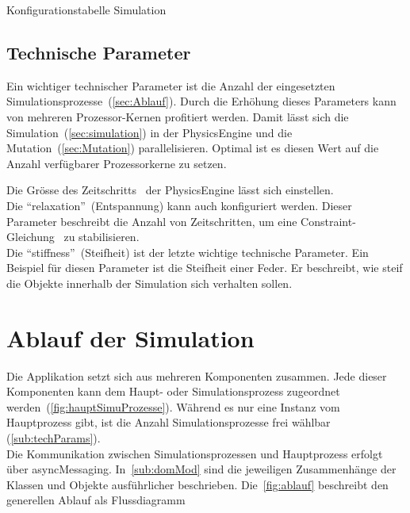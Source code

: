     \begin{table}[H]
      
      \caption{Konfigurationstabelle Simulation\label{tbl:simulation-parameters-general}}
    \end{table}

    \subsection{Technische Parameter\label{sub:techParams}}

      Ein wichtiger technischer Parameter ist die Anzahl der eingesetzten Simulationsprozesse~(\vref{sec:Ablauf}).
      Durch die Erhöhung dieses Parameters kann von mehreren Prozessor-Kernen profitiert werden.
      Damit lässt sich die Simulation~(\vref{sec:simulation}) in der \gls{PhysicsEngine} und die Mutation~(\vref{sec:Mutation}) parallelisieren.
      Optimal ist es diesen Wert auf die Anzahl verfügbarer Prozessorkerne zu setzen.

      \medskip

      Die Grösse des Zeitschritts~\cite{bullet:steppingTheWorld} der \gls{PhysicsEngine} lässt sich einstellen.
      \\
      Die ``relaxation''~(Entspannung) kann auch konfiguriert werden.
      Dieser Parameter beschreibt die Anzahl von Zeitschritten,
      um eine Constraint-Gleichung~\cite{gamedev:constraints} zu stabilisieren.
      \\
      Die ``stiffness''~(Steifheit) ist der letzte wichtige technische Parameter.
      Ein Beispiel für diesen Parameter ist die Steifheit einer Feder.
      Er beschreibt, wie steif die Objekte innerhalb der Simulation sich verhalten sollen.

  \section{Ablauf der Simulation\label{sec:Ablauf}}

    Die Applikation setzt sich aus mehreren Komponenten zusammen.
    Jede dieser Komponenten kann dem Haupt- oder Simulationsprozess zugeordnet werden~(\vref{fig:hauptSimuProzesse}).
    Während es nur eine Instanz vom Hauptprozess gibt,
    ist die Anzahl Simulationsprozesse frei wählbar (\vref{sub:techParams}).
    \\
    Die Kommunikation zwischen Simulationsprozessen und Hauptprozess erfolgt über \gls{asyncMessaging}.
    In~\vref{sub:domMod} sind die jeweiligen Zusammenhänge der Klassen und Objekte ausführlicher beschrieben.
    Die~\vref{fig:ablauf} beschreibt den generellen Ablauf als Flussdiagramm

